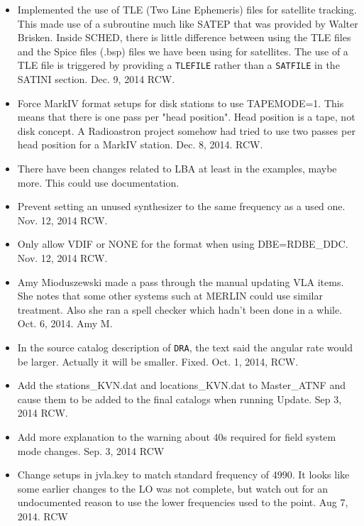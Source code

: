 \documentclass{report}
\begin{document}
\begin{itemize}
\item Implemented the use of TLE (Two Line Ephemeris) files for
satellite tracking.  This made use of a subroutine much like SATEP
that was provided by Walter Brisken.  Inside SCHED, there is little
difference between using the TLE files and the Spice files (.bsp)
files we have been using for satellites.  The use of a TLE file is
triggered by providing a {\tt TLEFILE} rather than a {\tt SATFILE} in
the SATINI section.  Dec. 9, 2014 RCW.

\item Force MarkIV format setups for disk stations to use TAPEMODE=1.
This means that there is one pass per "head position".  Head position
is a tape, not disk concept.  A Radioastron project somehow had 
tried to use two passes per head position for a MarkIV station.
Dec. 8, 2014.  RCW.

\item There have been changes related to LBA at least in the examples,
maybe more.  This could use documentation.

\item Prevent setting an unused synthesizer to the same frequency
as a used one.  Nov. 12, 2014  RCW.

\item Only allow VDIF or NONE for the format when using DBE=RDBE\_DDC.
Nov. 12, 2014  RCW.

\item Amy Mioduszewski made a pass through the manual updating VLA
items.  She notes that some other systems such at MERLIN could use
similar treatment.  Also she ran a spell checker which hadn't been
done in a while.  Oct. 6, 2014.  Amy M.

\item In the source catalog description of {\tt DRA}, the text said
the angular rate would be larger.  Actually it will be smaller.
Fixed.  Oct. 1, 2014, RCW.

\item Add the stations\_KVN.dat and locations\_KVN.dat to
Master\_ATNF and
cause them to be added to the final catalogs when running Update.  Sep
3, 2014  RCW.

\item Add more explanation to the warning about 40s required for field
system mode changes.  Sep. 3, 2014  RCW

\item Change setups in jvla.key to match standard frequency of 4990.  It
looks like some earlier changes to the LO was not complete, but watch
out for an undocumented reason to use the lower frequencies used to the 
point.  Aug 7, 2014.  RCW


\end{itemize}
\end{document}
